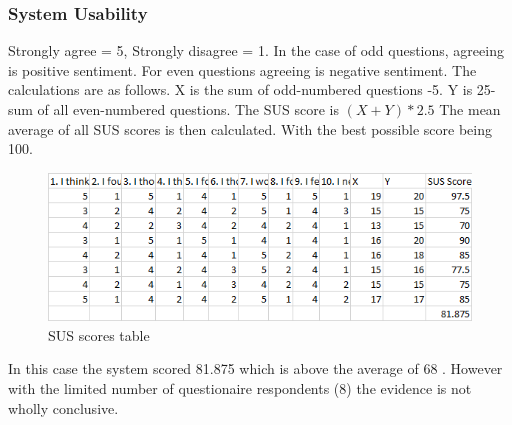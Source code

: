       \subsubsection{System Usability}
      Strongly agree = 5, Strongly disagree = 1. In the case of odd questions, agreeing is positive sentiment. For even questions agreeing is negative sentiment. The calculations are as follows. X is the sum of odd-numbered questions -5. Y is 25-sum of all even-numbered questions. The SUS score is $ (X+Y)*2.5 $ The mean average of all SUS scores is then calculated. With the best possible score being 100.
      \begin{figure}[H]
        \begin{center}
          \includegraphics[scale=0.7]{Images/susScoresTable}
          \caption{SUS scores table}
          \label{fig:sus_scores_table}
        \end{center}
      \end{figure}
      In this case the system scored 81.875 which is above the average of 68 \citep{Sauro2011}. However with the limited number of questionaire respondents (8) the evidence is not wholly conclusive.
